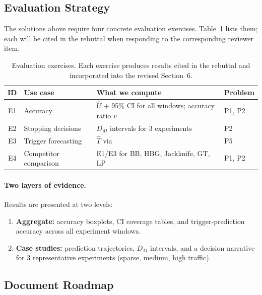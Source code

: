 \subsection{Evaluation Strategy}
\label{subsec:eval_strategy}

The solutions above require four concrete evaluation exercises.
Table~\ref{tab:eval_exercises} lists them; each will be cited
in the rebuttal when responding to the corresponding reviewer
item.

\begin{table}[H]
\centering
\caption{Evaluation exercises.
Each exercise produces results cited in the rebuttal and
incorporated into the revised Section~6.}
\label{tab:eval_exercises}
\small
\begin{tabular}{@{}clp{4cm}l@{}}
\toprule
\textbf{ID} & \textbf{Use case} &
\textbf{What we compute} & \textbf{Problem} \\
\midrule
E1 & Accuracy &
  $\hat{U}$ + 95\% CI for all windows;
  accuracy ratio $v$ &
  P1, P2 \\
E2 & Stopping decisions &
  $D_M$ intervals for 3 experiments &
  P2 \\
E3 & Trigger forecasting &
  $\hat{T}$ via \nbmodel{} &
  P5 \\
E4 & Competitor comparison &
  E1/E3 for BB, HBG, Jackknife, GT, LP &
  P1, P2 \\
\bottomrule
\end{tabular}
\end{table}

\paragraph{Two layers of evidence.}
Results are presented at two levels:
\begin{enumerate}[leftmargin=*]
  \item \textbf{Aggregate:} accuracy boxplots, CI coverage tables,
        and trigger-prediction accuracy across all experiment windows.
  \item \textbf{Case studies:} prediction trajectories, $D_M$
        intervals, and a decision narrative for 3 representative
        experiments (sparse, medium, high traffic).
\end{enumerate}


\subsection{Document Roadmap}
\label{subsec:roadmap}

